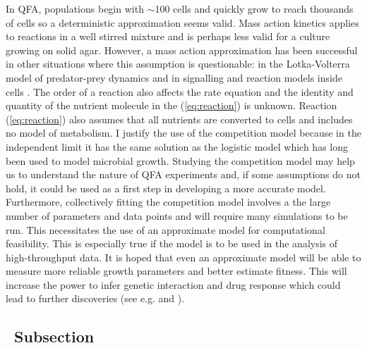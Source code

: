 
In QFA, populations begin with \(\sim\)100 cells and quickly grow to
reach thousands of cells so a deterministic approximation seems valid.
Mass action kinetics applies to reactions in a well stirred mixture
and is perhaps less valid for a culture growing on solid agar.
However, a mass action approximation has been successful in other
situations where this assumption is questionable: in the
Lotka-Volterra model of predator-prey dynamics \citep{Berryman1992}
and in signalling and reaction models inside cells
\citep{Aldridge2006,Chen2010}. The order of a reaction also affects
the rate equation and the identity and quantity of the nutrient
molecule in the (\ref{eq:reaction}) is unknown. Reaction
(\ref{eq:reaction}) also assumes that all nutrients are converted to
cells and includes no model of metabolism. I justify the use of the
competition model because in the independent limit it has the same
solution as the logistic model which has long been used to model
microbial growth. Studying the competition model may help us to
understand the nature of QFA experiments and, if some assumptions do
not hold, it could be used as a first step in developing a more
accurate model. Furthermore, collectively fitting the competition
model involves a the large number of parameters and data points and
will require many simulations to be run. This necessitates the use of
an approximate model for computational feasibility. This is especially
true if the model is to be used in the analysis of
high-throughput data. It is hoped that even an approximate model will
be able to measure more reliable growth parameters and better estimate
fitness. This will increase the power to infer genetic interaction and
drug response which could lead to further discoveries (see
e.g. \citet{Addinall2011} and \citet{Holstein20141259}).








\subsection{\thesubsection~Subsection}




